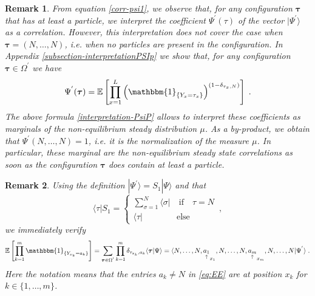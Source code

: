 \documentclass[10pt]{article}
\numberwithin{equation}{section}
\numberwithin{equation}{subsection}
\newtheorem{remark}{Remark}
\newcommand{\dt}{\;.}
\begin{document}
\begin{remark}
From equation \eqref{corr-psi1}, we observe that, for any configuration $\bm{\tau}$ that has at least a particle, we interpret the coefficient $\Psi^{'}(\tau)$ of the vector $|\Psi^{'}\rangle$ as a correlation. However, this interpretation does not cover the case when $\bm{\tau}=(N,\ldots,N)$, i.e. when no particles are present in the configuration. In Appendix \ref{subsection-interpretationPSIp} we show that, for any configuration $\bm{\tau}\in \Omega^{'}$ we have 
\begin{equation}\label{interpretation-PsiP}
	\Psi^{'}(\bm{\tau})=\mathbb{E}\left[\prod_{x=1}^{L}\left(\mathbbm{1}_{\{Y_{x}=\tau_{x}\}} \right)^{(1-\delta_{\tau_{x},N})}\right]\dt
\end{equation} 
The above formula \eqref{interpretation-PsiP} allows to interpret these coefficients as marginals of the non-equilibrium steady distribution $\mu$. As a by-product, we obtain that $\Psi^{'}(N,\ldots,N)=1$, i.e. it is the normalization of the measure $\mu$. In particular, these marginal are the non-equilibrium steady state correlations as soon as the configuration $\bm{\tau}$ does contain at least a particle. 
\end{remark} 



\begin{remark} 
Using  the definition $|\Psi^{'}\rangle=S_1|\Psi\rangle$ and that
\begin{equation}
 \langle \tau |S_1=\begin{cases}
                    \sum_{\sigma=1}^N\langle \sigma|  \quad\text{if}\quad \tau=N\\
                    \langle \tau| \qquad\qquad\text{else} 
                   \end{cases}\,,
\end{equation} 
  we immediately verify 
\begin{equation}\label{eq:EE}
\begin{split}
\mathbb{E}\left[\prod_{k=1}^{m}\mathbbm{1}_{\{Y_{x_{k}}=a_{k}\}}\right]=\sum_{\bm{\tau}\in\Omega^{'}}\prod_{k=1}^{m}\delta_{{{\tau}_{x_k}},a_{k}}\langle \bm{\tau}|\Psi\rangle=
\langle N,\ldots,N,\underset{\uparrow}{a_1}_{x_{1}},N,\ldots,N,\underset{\uparrow}{a_m}_{x_{m}},N,\ldots,N|\Psi^{'}\rangle\dt
 \end{split}
\end{equation} 
{Here the notation means that the entries $a_k\neq N$ in \eqref{eq:EE} are at position $x_k$ for $k\in\{1,\ldots,m\}$.} 
\end{remark}
 
\end{document}

